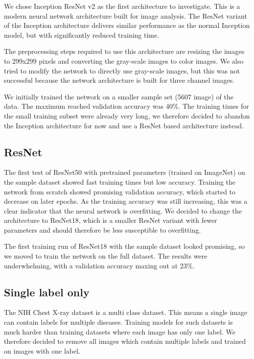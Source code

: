 We chose Inception ResNet v2 \cite{szegedy2017inception} as the first architecture to investigate. This is a modern neural network architecture built for image analysis.
The ResNet variant of the Inception architecture delivers similar performance as the normal Inception model, but with significantly reduced training time.

The preprocessing steps required to use this architecture are resizing the images to 299x299 pixels and converting the gray-scale images to color images.
We also tried to modify the network to directly use gray-scale images, but this was not successful because the network architecture is built for three channel images.

We initially trained the network on a smaller sample set (5607 image) of the data. The maximum reached validation accuracy was 40\%. The training times for the small training subset
were already very long, we therefore decided to abandon the Inception architecture for now and use a ResNet based architecture instead.

\subsection{ResNet}

The first test of ResNet50 \cite{he2016deep} with pretrained parameters (trained on ImageNet) on the sample dataset showed fast training times but low accuracy. Training the network from scratch showed promising validation accuracy, which started to decrease on later epochs. As the training accuracy was still increasing, this was a clear indicator that the neural network is overfitting. We decided to change the architecture to ResNet18, which is a smaller ResNet variant with fewer parameters and should therefore be less susceptible to overfitting.

The first training run of ResNet18 with the sample dataset looked promising, so we moved to train the network on the full dataset. The results were underwhelming, with a validation accuracy maxing out at 23\%.

\subsection{Single label only}
The NIH Chest X-ray dataset is a multi class dataset. This means a single image can contain labels for multiple diseases. Training models for such datasets is much harder than training datasets where each image has only one label. We therefore decided to remove all images which contain multiple labels and trained on images with one label.


